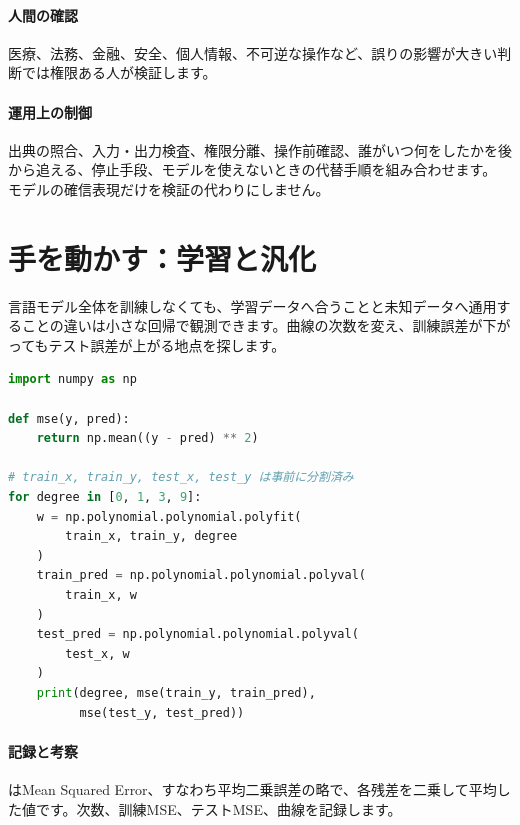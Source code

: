 \par
\endgroup
\medskip
\begingroup
\paragraph{人間の確認}
        医療、法務、金融、安全、個人情報、不可逆な操作など、誤りの影響が大きい判断では権限ある人が検証します。

\par
\endgroup
  \vspace{5mm}
\paragraph{運用上の制御}
    出典の照合、入力・出力検査、権限分離、操作前確認、誰がいつ何をしたかを後から追える、停止手段、モデルを使えないときの代替手順を組み合わせます。
    モデルの確信表現だけを検証の代わりにしません。

\par
\endgroup


\section{手を動かす：学習と汎化}
\label{sec:06-machine-learning-34}

言語モデル全体を訓練しなくても、学習データへ合うことと未知データへ通用することの違いは小さな回帰で観測できます。曲線の次数を変え、訓練誤差が下がってもテスト誤差が上がる地点を探します。

\begingroup
\begingroup
      \begin{lstlisting}[language=Python,basicstyle=\ttfamily\fontsize{6.8}{8.1}\selectfont]
import numpy as np

def mse(y, pred):
    return np.mean((y - pred) ** 2)

# train_x, train_y, test_x, test_y は事前に分割済み
for degree in [0, 1, 3, 9]:
    w = np.polynomial.polynomial.polyfit(
        train_x, train_y, degree
    )
    train_pred = np.polynomial.polynomial.polyval(
        train_x, w
    )
    test_pred = np.polynomial.polynomial.polyval(
        test_x, w
    )
    print(degree, mse(train_y, train_pred),
          mse(test_y, test_pred))
      \end{lstlisting}
\par
\endgroup
\medskip
\begingroup
\paragraph{記録と考察}
        はMean Squared Error、すなわち平均二乗誤差の略で、各残差を二乗して平均した値です。次数、訓練MSE、テストMSE、曲線を記録します。

